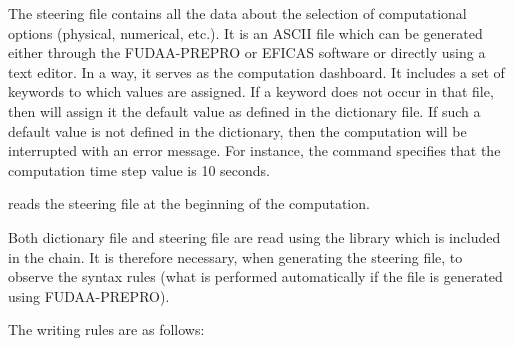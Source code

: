 The steering file contains all the data about the selection of computational
options (physical, numerical, etc.). It is an ASCII file which can be generated
either through the FUDAA-PREPRO or EFICAS software or directly using a text
editor. In a way, it serves as the computation dashboard. It includes a set of
keywords to which values are assigned. If a keyword does not occur in that
file, then  will assign it the default value as defined in the
dictionary file. If such a default value is not defined in the dictionary, then
the computation will be interrupted with an error message. For instance, the
command  specifies that the computation time step
value is 10 seconds.

 reads the steering file at the beginning of the computation.

Both dictionary file and steering file are read using the 
library which is included in the \tel chain. It is therefore necessary,
when generating the steering file, to observe the  syntax
rules (what is performed automatically if the file is generated using
FUDAA-PREPRO).

The writing rules are as follows:


